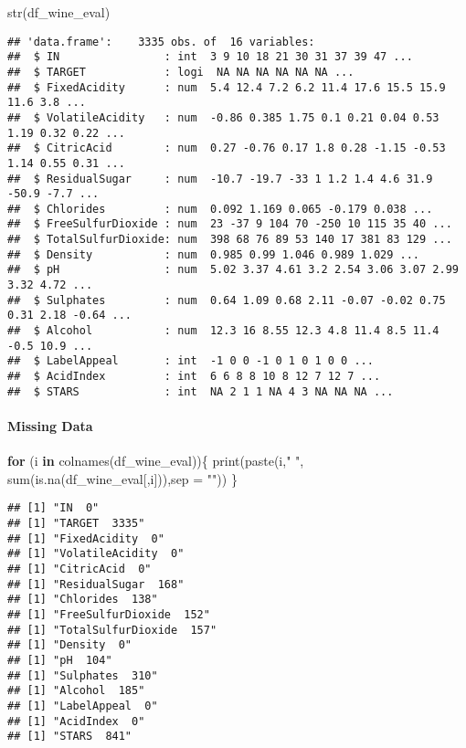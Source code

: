 \documentclass[
]{article}
\newenvironment{Shaded}{\begin{snugshade}}{\end{snugshade}}
\newcommand{\AttributeTok}[1]{\textcolor[rgb]{0.77,0.63,0.00}{#1}}
\newcommand{\ControlFlowTok}[1]{\textcolor[rgb]{0.13,0.29,0.53}{\textbf{#1}}}
\newcommand{\FunctionTok}[1]{\textcolor[rgb]{0.00,0.00,0.00}{#1}}
\newcommand{\NormalTok}[1]{#1}
\newcommand{\StringTok}[1]{\textcolor[rgb]{0.31,0.60,0.02}{#1}}
\begin{document}
\begin{Shaded}
\begin{Highlighting}[]
\FunctionTok{str}\NormalTok{(df\_wine\_eval)}
\end{Highlighting}
\end{Shaded}

\begin{verbatim}
## 'data.frame':    3335 obs. of  16 variables:
##  $ IN                : int  3 9 10 18 21 30 31 37 39 47 ...
##  $ TARGET            : logi  NA NA NA NA NA NA ...
##  $ FixedAcidity      : num  5.4 12.4 7.2 6.2 11.4 17.6 15.5 15.9 11.6 3.8 ...
##  $ VolatileAcidity   : num  -0.86 0.385 1.75 0.1 0.21 0.04 0.53 1.19 0.32 0.22 ...
##  $ CitricAcid        : num  0.27 -0.76 0.17 1.8 0.28 -1.15 -0.53 1.14 0.55 0.31 ...
##  $ ResidualSugar     : num  -10.7 -19.7 -33 1 1.2 1.4 4.6 31.9 -50.9 -7.7 ...
##  $ Chlorides         : num  0.092 1.169 0.065 -0.179 0.038 ...
##  $ FreeSulfurDioxide : num  23 -37 9 104 70 -250 10 115 35 40 ...
##  $ TotalSulfurDioxide: num  398 68 76 89 53 140 17 381 83 129 ...
##  $ Density           : num  0.985 0.99 1.046 0.989 1.029 ...
##  $ pH                : num  5.02 3.37 4.61 3.2 2.54 3.06 3.07 2.99 3.32 4.72 ...
##  $ Sulphates         : num  0.64 1.09 0.68 2.11 -0.07 -0.02 0.75 0.31 2.18 -0.64 ...
##  $ Alcohol           : num  12.3 16 8.55 12.3 4.8 11.4 8.5 11.4 -0.5 10.9 ...
##  $ LabelAppeal       : int  -1 0 0 -1 0 1 0 1 0 0 ...
##  $ AcidIndex         : int  6 6 8 8 10 8 12 7 12 7 ...
##  $ STARS             : int  NA 2 1 1 NA 4 3 NA NA NA ...
\end{verbatim}

\hypertarget{missing-data}{%
\paragraph{Missing Data}\label{missing-data}}

\begin{Shaded}
\begin{Highlighting}[]
\ControlFlowTok{for}\NormalTok{ (i }\ControlFlowTok{in} \FunctionTok{colnames}\NormalTok{(df\_wine\_eval))\{}
  \FunctionTok{print}\NormalTok{(}\FunctionTok{paste}\NormalTok{(i,}\StringTok{"  "}\NormalTok{, }\FunctionTok{sum}\NormalTok{(}\FunctionTok{is.na}\NormalTok{(df\_wine\_eval[,i])),}\AttributeTok{sep =} \StringTok{""}\NormalTok{))}
\NormalTok{\}}
\end{Highlighting}
\end{Shaded}

\begin{verbatim}
## [1] "IN  0"
## [1] "TARGET  3335"
## [1] "FixedAcidity  0"
## [1] "VolatileAcidity  0"
## [1] "CitricAcid  0"
## [1] "ResidualSugar  168"
## [1] "Chlorides  138"
## [1] "FreeSulfurDioxide  152"
## [1] "TotalSulfurDioxide  157"
## [1] "Density  0"
## [1] "pH  104"
## [1] "Sulphates  310"
## [1] "Alcohol  185"
## [1] "LabelAppeal  0"
## [1] "AcidIndex  0"
## [1] "STARS  841"
\end{verbatim}
\end{document}
